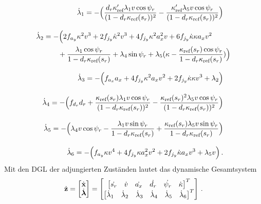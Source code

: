 \begin{align}
	\begin{split}
		\dot{\lambda}_1 &= -\Big(\frac{d_r\kappa'_{\textrm{ref}}\lambda_1v\cos{\psi_r}}{(1-d_r\kappa_{\textrm{ref}}(s_r))^2} - \frac{\kappa'_{\textrm{ref}}\lambda_5v\cos{\psi_r}}{(1-d_r\kappa_{\textrm{ref}}(s_r))^2}\Big)
	\end{split} \label{eq:dlambda1}
	\\[2ex]
	\begin{split}
		\dot{\lambda}_2 &= -\Big(2f_{a_y} \kappa^2v^3 + 2f_{j_y}\dot{\kappa}^2v^3 + 4f_{j_y}\kappa^2a_x^2v + 6f_{j_y}\dot{\kappa}\kappa a_xv^2 \\
		&\qquad + \frac{\lambda_1\cos{\psi_r}}{1-d_r\kappa_{\textrm{ref}}(s_r)} + \lambda_4\sin{\psi_r} + \lambda_5(\kappa - \frac{\kappa_{\textrm{ref}}(s_r) \cos{\psi_r}}{1-d_r\kappa_{\textrm{ref}}(s_r)})\Big)
	\end{split} \label{eq:dlambda2}
	\\[2ex]
	\begin{split}
		\dot{\lambda}_3 &= -\Big(f_{a_x} a_x + 4f_{j_y}\kappa^2a_xv^2 + 2f_{j_y}\dot{\kappa}\kappa v^3 + \lambda_2 \Big)
	\end{split} \label{eq:dlambda3}
	\\[2ex]
	\begin{split}
		\dot{\lambda}_4 &= -\Big(f_{d_r} d_r + \frac{\kappa_{\textrm{ref}}(s_r)\lambda_1v\cos{\psi_r}}{(1-d_r\kappa_{\textrm{ref}}(s_r))^2} -\frac{\kappa_{\textrm{ref}}(s_r)^2\lambda_5v\cos{\psi_r}}{(1-d_r\kappa_{\textrm{ref}}(s_r))^2} \Big)
	\end{split} \label{eq:dlambda4}
	\\[2ex]
	\begin{split}
		\dot{\lambda}_5 &= -\Big(\lambda_4v\cos{\psi_r} - \frac{\lambda_1v\sin{\psi_r}}{1-d_r\kappa_{\textrm{ref}}(s_r)} + \frac{\kappa_{\textrm{ref}}(s_r)\lambda_5v\sin{\psi_r}}{1-d_r\kappa_{\textrm{ref}}(s_r)}\Big)
	\end{split} \label{eq:dlambda5}
	\\[2ex]
	\begin{split}
		\dot{\lambda}_6 &= -\Big(f_{a_y}\kappa v^4 + 4f_{j_y}\kappa a_x^2v^2 + 2f_{j_y} \dot{\kappa}a_xv^3 + \lambda_5v \Big)\,.
	\end{split} \label{eq:dlambda6}
\end{align}
Mit den \gls{DGL} der adjungierten Zuständen lautet das dynamische Gesamtsystem
\begin{equation}
	\dot{\boldsymbol{\mathrm{z}}} = \begin{bmatrix}
	\dot{\boldsymbol{\mathrm{x}}} \\
	\dot{\boldsymbol{\mathrm{\lambda}}}
	\end{bmatrix} =
	\begin{bmatrix}
		\begin{bmatrix}
		\dot{s_r} & \dot{v} & \dot{a_x} & \dot{d_r} & \dot{\psi_r} & \dot{\kappa}
		\end{bmatrix}^T\\
		\begin{bmatrix}
		\dot{\lambda}_1 & \dot{\lambda}_2 & \dot{\lambda}_3 & \dot{\lambda}_4 & \dot{\lambda}_5 & \dot{\lambda}_6
		\end{bmatrix}^T
	\end{bmatrix}\,.
\end{equation}
